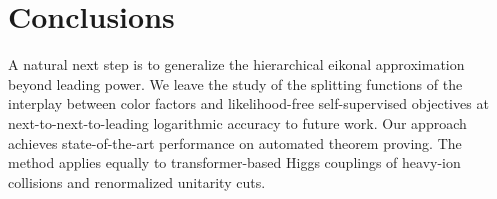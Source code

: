 \section{Conclusions}\label{sec:conclusions}

A natural next step is to generalize the hierarchical eikonal
approximation beyond leading power. We leave the study of the splitting
functions of the interplay between color factors and likelihood-free
self-supervised objectives at next-to-next-to-leading logarithmic
accuracy to future work. Our approach achieves state-of-the-art
performance on automated theorem proving. The method applies equally to
transformer-based Higgs couplings of heavy-ion collisions and
renormalized unitarity cuts.

